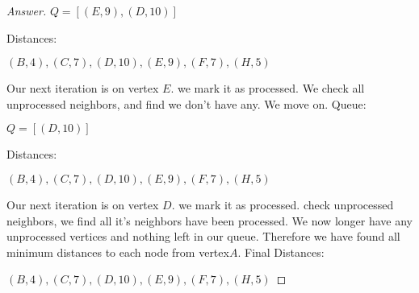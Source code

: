 \documentclass[11pt]{article}
\theoremstyle{definition}
\theoremstyle{definition}
\theoremstyle{definition}
\begin{document}
\begin{proof}[Answer]
$Q=[(E,9), (D,10)]$


Distances:

$(B,4),(C,7),(D,10),(E,9),(F,7),(H,5)$


Our next iteration is on vertex $E$. we mark it as processed. We check all unprocessed neighbors, and find we don't have any. We move on. Queue:

$Q=[(D,10)]$

Distances:

$(B,4),(C,7),(D,10),(E,9),(F,7),(H,5)$

Our next iteration is on vertex $D$. we mark it as processed. check unprocessed neighbors, we find all it's neighbors have been processed. We now longer have any unprocessed vertices and nothing left in our queue. Therefore we have found all minimum distances to each node from vertex$A$. Final Distances:

$(B,4),(C,7),(D,10),(E,9),(F,7),(H,5)$
\end{proof}




\end{document}
